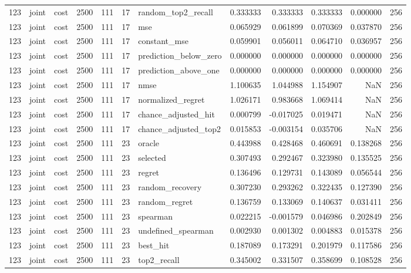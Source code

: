 \begin{tabular}{rllrrrlrrrrr}
123 & joint & cost & 2500 & 111 & 17 & random_top2_recall & 0.333333 & 0.333333 & 0.333333 & 0.000000 & 256 \\
123 & joint & cost & 2500 & 111 & 17 & mse & 0.065929 & 0.061899 & 0.070369 & 0.037870 & 256 \\
123 & joint & cost & 2500 & 111 & 17 & constant_mse & 0.059901 & 0.056011 & 0.064710 & 0.036957 & 256 \\
123 & joint & cost & 2500 & 111 & 17 & prediction_below_zero & 0.000000 & 0.000000 & 0.000000 & 0.000000 & 256 \\
123 & joint & cost & 2500 & 111 & 17 & prediction_above_one & 0.000000 & 0.000000 & 0.000000 & 0.000000 & 256 \\
123 & joint & cost & 2500 & 111 & 17 & nmse & 1.100635 & 1.044988 & 1.154907 & NaN & 256 \\
123 & joint & cost & 2500 & 111 & 17 & normalized_regret & 1.026171 & 0.983668 & 1.069414 & NaN & 256 \\
123 & joint & cost & 2500 & 111 & 17 & chance_adjusted_hit & 0.000799 & -0.017025 & 0.019471 & NaN & 256 \\
123 & joint & cost & 2500 & 111 & 17 & chance_adjusted_top2 & 0.015853 & -0.003154 & 0.035706 & NaN & 256 \\
123 & joint & cost & 2500 & 111 & 23 & oracle & 0.443988 & 0.428468 & 0.460691 & 0.138268 & 256 \\
123 & joint & cost & 2500 & 111 & 23 & selected & 0.307493 & 0.292467 & 0.323980 & 0.135525 & 256 \\
123 & joint & cost & 2500 & 111 & 23 & regret & 0.136496 & 0.129731 & 0.143089 & 0.056544 & 256 \\
123 & joint & cost & 2500 & 111 & 23 & random_recovery & 0.307230 & 0.293262 & 0.322435 & 0.127390 & 256 \\
123 & joint & cost & 2500 & 111 & 23 & random_regret & 0.136759 & 0.133069 & 0.140637 & 0.031411 & 256 \\
123 & joint & cost & 2500 & 111 & 23 & spearman & 0.022215 & -0.001579 & 0.046986 & 0.202849 & 256 \\
123 & joint & cost & 2500 & 111 & 23 & undefined_spearman & 0.002930 & 0.001302 & 0.004883 & 0.015378 & 256 \\
123 & joint & cost & 2500 & 111 & 23 & best_hit & 0.187089 & 0.173291 & 0.201979 & 0.117586 & 256 \\
123 & joint & cost & 2500 & 111 & 23 & top2_recall & 0.345002 & 0.331507 & 0.358699 & 0.108528 & 256 \\

\end{tabular}

